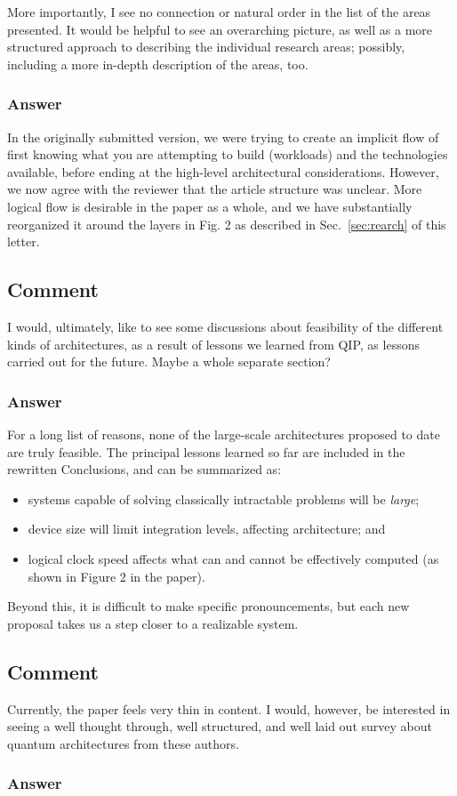 \documentclass{article}
\newcommand{\comment}{\subsection{Comment}\em}
\newcommand{\answer}{\rm \subsubsection*{Answer}}
\begin{document}
More importantly, I see no connection or natural order in the list of
the areas presented.  It would be helpful to see an overarching
picture, as well as a more structured approach to describing the
individual research areas; possibly, including a more in-depth
description of the areas, too.

\answer

In the originally submitted version, we were trying to create an
implicit flow of first knowing what you are attempting to build
(workloads) and the technologies available, before ending at the
high-level architectural considerations.  However, we now agree with
the reviewer that the article structure was unclear.  More logical
flow is desirable in the paper as a whole, and we have substantially
reorganized it around the layers in Fig. 2 as described in
Sec.~\ref{sec:rearch} of this letter.

\comment

I would, ultimately, like to see some discussions about feasibility of
the different kinds of architectures, as a result of lessons we
learned from QIP, as lessons carried out for the future.  Maybe a
whole separate section?

\answer

For a long list of reasons, none of the large-scale architectures
proposed to date are truly feasible.  The principal lessons learned so
far are included in the rewritten Conclusions, and can be summarized
as:

\begin{itemize}
\item systems capable of solving classically intractable problems will
  be {\em large};
\item device size will limit integration levels, affecting
  architecture; and
\item logical clock speed affects what can and cannot be effectively
  computed (as shown in Figure 2 in the paper).
\end{itemize}

Beyond this, it is difficult to make specific pronouncements, but each
new proposal takes us a step closer to a realizable system.

\comment

Currently, the paper feels very thin in content.  I would, however, be
interested in seeing a well thought through, well structured, and well
laid out survey about quantum architectures from these authors.

\answer
\end{document}
